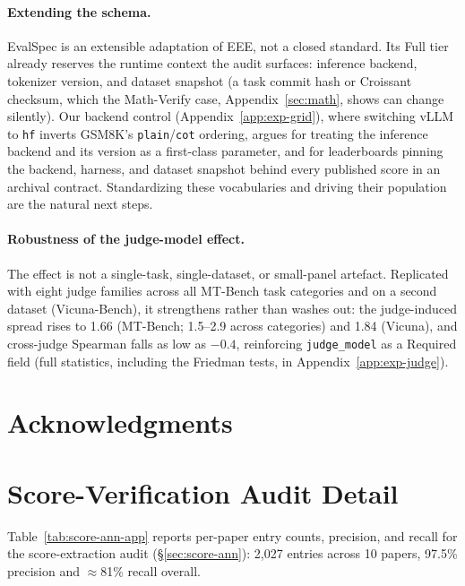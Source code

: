 \documentclass[11pt]{article}
\begin{document}
\paragraph{Extending the schema.} EvalSpec is an extensible adaptation of EEE, not
a closed standard. Its Full tier already reserves the runtime context the audit
surfaces: inference backend, tokenizer version, and dataset snapshot (a task commit
hash or Croissant checksum, which the Math-Verify case, Appendix~\ref{sec:math},
shows can change silently). Our backend control (Appendix~\ref{app:exp-grid}), where
switching vLLM to \texttt{hf} inverts GSM8K's \texttt{plain}/\texttt{cot} ordering,
argues for treating the inference backend and its version as a first-class parameter,
and for leaderboards pinning the backend, harness, and dataset snapshot behind every
published score in an archival contract. Standardizing these vocabularies and driving
their population are the natural next steps.

\paragraph{Robustness of the judge-model effect.} The effect is not a single-task,
single-dataset, or small-panel artefact. Replicated with eight judge families across
all MT-Bench task categories and on a second dataset (Vicuna-Bench), it strengthens
rather than washes out: the judge-induced spread rises to 1.66 (MT-Bench; 1.5--2.9
across categories) and 1.84 (Vicuna), and cross-judge Spearman falls as low as
$-0.4$, reinforcing \texttt{judge\_model} as a Required field (full statistics,
including the Friedman tests, in Appendix~\ref{app:exp-judge}).

\section*{Acknowledgments}


\appendix

\section{Score-Verification Audit Detail}
\label{app:audit}

Table~\ref{tab:score-ann-app} reports per-paper entry counts, precision, and
recall for the score-extraction audit (\S\ref{sec:score-ann}): 2{,}027 entries
across 10 papers, 97.5\% precision and $\approx$81\% recall overall.
\end{document}
